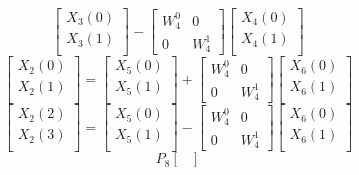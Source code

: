 \documentclass[journal,12pt,twocolumn]{IEEEtran}
\renewcommand\thesection{\arabic{section}}
\begin{document}
\begin{enumerate}[label=\arabic*.,ref=\thesection.\theenumi]
\begin{equation}
\begin{bmatrix}
X_{3}(0) \\ 
X_{3}(1)\\ 
\end{bmatrix}
-
\begin{bmatrix}
W^{0}_{4} & 0\\
0 & W^{1}_{4}
\end{bmatrix}
\begin{bmatrix}
X_{4}(0) \\ 
X_{4}(1) \\ 
\end{bmatrix}
\end{equation}
\begin{equation}
\begin{bmatrix}
X_{2}(0) \\ 
X_{2}(1)\\ 
\end{bmatrix}
=
\begin{bmatrix}
X_{5}(0) \\ 
X_{5}(1)\\ 
\end{bmatrix}
+
\begin{bmatrix}
W^{0}_{4} & 0\\
0 & W^{1}_{4}
\end{bmatrix}
\begin{bmatrix}
X_{6}(0) \\ 
X_{6}(1) \\ 
\end{bmatrix}
\end{equation}
\begin{equation}
\begin{bmatrix}
X_{2}(2) \\ 
X_{2}(3)\\ 
\end{bmatrix}
=
\begin{bmatrix}
X_{5}(0) \\ 
X_{5}(1)\\ 
\end{bmatrix}
-
\begin{bmatrix}
W^{0}_{4} & 0\\
0 & W^{1}_{4}
\end{bmatrix}
\begin{bmatrix}
X_{6}(0) \\ 
X_{6}(1) \\ 
\end{bmatrix}
\end{equation}
\begin{equation}
P_{8}
\begin{bmatrix}

\end{bmatrix}
\end{equation}
\end{enumerate}
\end{document}
